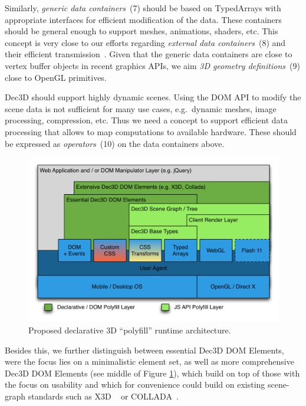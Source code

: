 \documentclass{acmsiggraph}
\begin{document}
Similarly, \textit{generic data containers}~(7) should be based on TypedArrays \cite{TypArr12} with appropriate interfaces for efficient modification of the data. These containers should be general enough to support meshes, animations, shaders, etc. This concept is very close to our efforts regarding \textit{external data containers}~(8) and their efficient transmission~\cite{Behr12,Trevett12}. Given that the generic data containers are close to vertex buffer objects in recent graphics APIs, we aim \textit{3D geometry definitions}~(9) close to OpenGL primitives.

Dec3D should support highly dynamic scenes. Using the DOM API to modify the scene data is not sufficient for many use cases, e.g.\ dynamic meshes, image processing, compression, etc. Thus we need a concept to support efficient data processing that allows to map computations to available hardware. These should be expressed as \textit{operators}~(10) on the data containers above.

\begin{figure}
  \centering
  \includegraphics[width=1.0\columnwidth]{images/Dec3D-Architecture.png}
  \caption{Proposed declarative 3D ``polyfill'' runtime architecture.}
  \label{fig:polyArch}
\end{figure}

Besides this, we further distinguish between essential Dec3D DOM Elements, were the focus lies on a minimalistic element set, as well as more comprehensive Dec3D DOM Elements (see middle of Figure \ref{fig:polyArch}), which build on top of those with the focus on usability and which for convenience could build on existing scene-graph standards such as X3D ~\cite{Web3D-X3D} or COLLADA~\cite{Arnaud06}.
\end{document}
